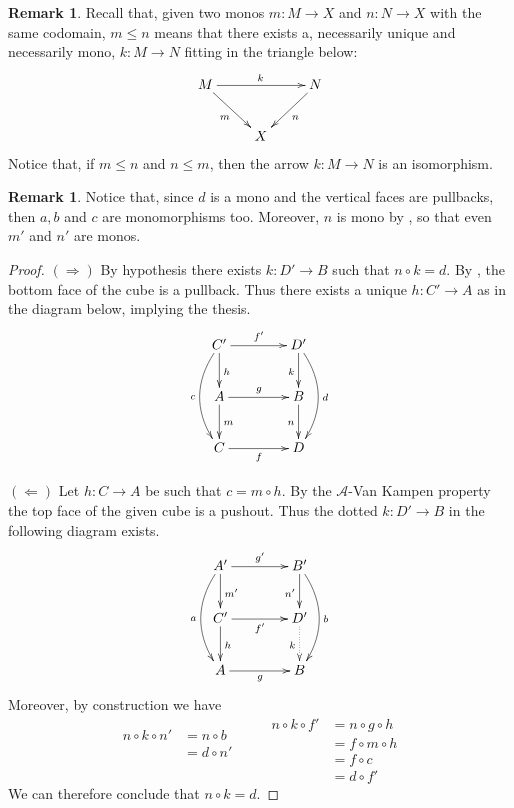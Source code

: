 \documentclass[a4paper]{article}
\theoremstyle{definition}
\newtheorem{remark}[theorem]{Remark}
\begin{document}
\begin{remark}
	Recall that, given two monos $m:M\to X$ and $n:N\to X$ with the same codomain, $m\leq n$ means that there exists a, necessarily unique and necessarily mono, $k:M\to N$ fitting in the triangle below:
	\[\xymatrix{M\ar[rr]^{k}  \ar[dr]_{m}&& N \ar[dl]^{n}\\ & X}\]
	Notice that, if $m\leq n$ and $n\leq m$, then the arrow $k:M\to N$ is an isomorphism.  
\end{remark}
\begin{remark}
	Notice that, since $d$ is a mono and the vertical faces are pullbacks, then $a, b$ and $c$ are monomorphisms too. Moreover, $n$ is mono by , so that even $m'$ and $n'$ are monos.
\end{remark}

\begin{proof}
	$(\Rightarrow)$ By hypothesis there exists $k:D'\to B$ such that $n\circ k = d$. By , the bottom face of the cube is a pullback. Thus there exists a unique $h:C'\to A$ as in the diagram below, implying the thesis.
		\[\xymatrix@C=40pt{C'  \ar[d]^{h}\ar[r]^{f'} \ar@/_.5cm/[dd]_{c}& D' \ar@/^.5cm/[dd]^{d}\ar[d]_{k}\\ A \ar[d]^{m} \ar[r]^{g} & B \ar[d]_{n} \\  C \ar[r]_f & D}\]
	
	\smallskip \noindent 
	$(\Leftarrow)$ Let $h:C\to A$ be such that $c=m\circ h$. By the $\mathcal{A}$-Van Kampen property the top face of the given cube is a pushout. Thus the dotted $k:D'\to B$ in the following diagram exists.
		\[\xymatrix@C=40pt{A' \ar@/_.5cm/[dd]_{a} \ar[d]^{m'} \ar[r]^{g'} & B' \ar[d]_{n'} \ar@/^.5cm/[dd]^{b} \\  C' \ar[d]^{h} \ar[r]_{f'} & D' \ar@{.>}[d]_{k}\\ A \ar[r]_g& B }\]
Moreover, by construction we have
\[\begin{split}
n\circ k \circ n' &= n\circ b\\&=d\circ n'\\&\\&
\end{split} \qquad \begin{split}
n\circ k \circ f' &= n\circ g\circ h\\&=f\circ m\circ h\\&=f\circ c\\&= d\circ f' \end{split}\]
We can therefore conclude that $n\circ k =d$. \qedhere 
\end{proof}
\end{document}
